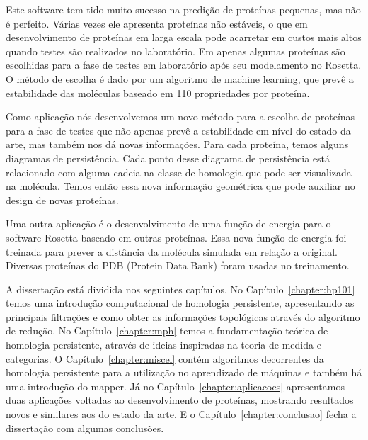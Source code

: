 Este software tem tido muito sucesso na predição de proteínas pequenas, mas não é
perfeito. Várias vezes ele apresenta proteínas não estáveis, o que em desenvolvimento
de proteínas em larga escala pode acarretar em custos mais altos quando testes são realizados
no laboratório. Em \cite{Rocklin2017} apenas algumas proteínas são escolhidas
para a fase de testes em laboratório após seu modelamento no Rosetta. O método
de escolha é dado por um algoritmo de machine learning, que prevê a estabilidade
das moléculas baseado em 110 propriedades por proteína.

Como aplicação nós desenvolvemos um novo método para a escolha
de proteínas para a fase de testes que não apenas prevê a estabilidade em nível
do estado da arte, mas também nos dá novas informações. Para cada proteína, temos
alguns diagramas de persistência. Cada ponto desse diagrama de persistência
está relacionado com alguma cadeia na classe de homologia que pode ser 
visualizada na molécula. Temos então essa nova informação geométrica
que pode auxiliar no design de novas proteínas. 

Uma outra aplicação é o desenvolvimento de uma função de energia para o software 
Rosetta baseado em outras proteínas. Essa nova função de energia foi treinada
para prever a distância da molécula simulada em relação a original. Diversas proteínas
do PDB (Protein Data Bank) foram usadas no treinamento.

A dissertação está dividida nos seguintes capítulos. No Capítulo~\ref{chapter:hp101}
temos uma introdução computacional de homologia persistente, apresentando as principais
filtrações e como obter as informações topológicas através do algoritmo de redução. 
No Capítulo~\ref{chapter:mph} temos a fundamentação teórica de homologia persistente,
através de ideias inspiradas na teoria de medida e categorias. O Capítulo~\ref{chapter:miscel}
contém algoritmos decorrentes da homologia persistente para a utilização no aprendizado
de máquinas e também há uma introdução do mapper. Já no Capítulo~\ref{chapter:aplicacoes}
apresentamos duas aplicações voltadas ao desenvolvimento de proteínas, mostrando resultados
novos e similares aos do estado da arte. E o Capítulo~\ref{chapter:conclusao} fecha a dissertação
com algumas conclusões.  

